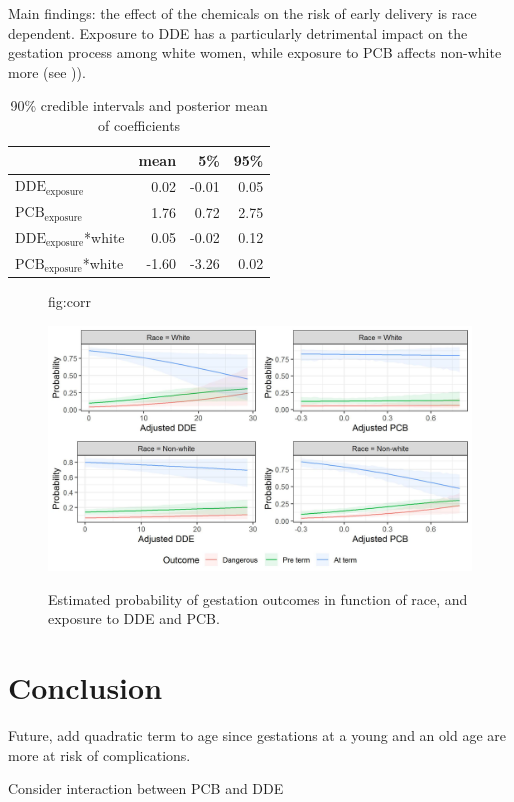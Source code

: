 \documentclass[wcp]{jmlr}%
\begin{document}
Main findings: the effect of the chemicals on the risk of early delivery is race dependent. Exposure to DDE has a particularly detrimental impact on the gestation process among white women, while exposure to PCB affects non-white more (see )).

\begin{table}
	\centering
	\begin{tabular}{l|r|r|r}
		\hline
		& mean & 5\% & 95\%\\
		\hline
		$\text{DDE}_{\text{exposure}}$ & 0.02 & -0.01 & 0.05\\
		\hline
		$\text{PCB}_{\text{exposure}}$& 1.76 & 0.72 & 2.75\\
		\hline
		$\text{DDE}_{\text{exposure}}$*white & 0.05 & -0.02 & 0.12\\
		\hline
		$\text{PCB}_{\text{exposure}}$*white & -1.60 & -3.26 & 0.02\\
		\hline
	\end{tabular}
    \caption{\label{tab:confints} 90\% credible intervals and posterior mean of coefficients}
\end{table}


\begin{figure}[htbp]
	\floatconts
	{fig:corr}
	{\caption{Estimated probability of gestation outcomes in function of race, and exposure to DDE and PCB.}}
	{\includegraphics[width=0.8\linewidth]{results}}
\end{figure}



\section{Conclusion}
\label{sec:conclusion}

Future, add quadratic term to age since gestations at a young and an old age are more at risk of complications.

Consider interaction between PCB and DDE

%
\end{document}
